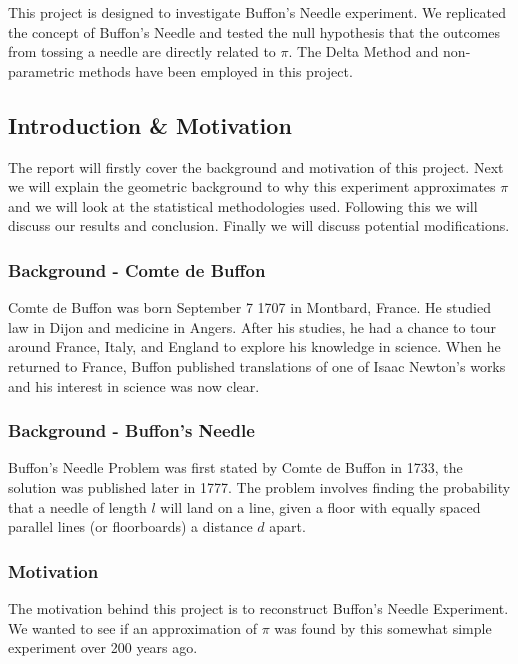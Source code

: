 This project is designed to investigate Buffon's Needle experiment. We replicated the concept of Buffon's Needle and tested the null hypothesis that the outcomes from tossing a needle are directly related to $\pi$. The Delta Method and non-parametric methods have been employed in this project.

\subsection{Introduction \& Motivation}

The report will firstly cover the background and motivation of this project. Next we will explain the geometric background to why this experiment approximates $\pi$ and we will look at the statistical methodologies used. Following this we will discuss our results and conclusion. Finally we will discuss potential modifications.

\subsubsection*{Background - Comte de Buffon}

Comte de Buffon was born September 7 1707 in Montbard, France. He studied law in Dijon and medicine in Angers. After his studies, he had a chance to tour around France, Italy, and England to explore his knowledge in science. When he returned to France, Buffon published translations of one of Isaac Newton's works and his interest in science was now clear.

\subsubsection*{Background - Buffon's Needle}

Buffon's Needle Problem was first stated by Comte de Buffon in 1733, the solution was published later in 1777. The problem involves finding the probability that a needle of length $l$ will land on a line, given a floor with equally spaced parallel lines (or floorboards) a distance $d$ apart.

\subsubsection*{Motivation}

The motivation behind this project is to reconstruct Buffon's Needle Experiment. We wanted to see if an approximation of $\pi$ was found by this somewhat simple experiment over 200 years ago.

